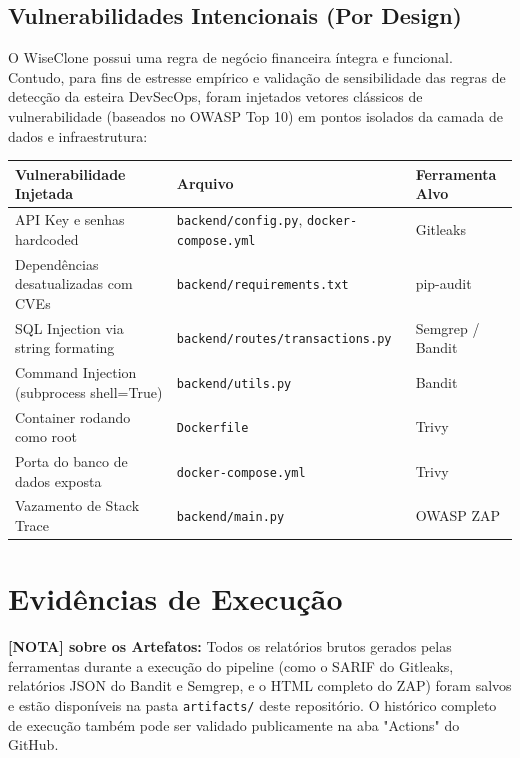 \documentclass[12pt,a4paper]{article}
\begin{document}
\subsection{Vulnerabilidades Intencionais (Por Design)}
O WiseClone possui uma regra de negócio financeira íntegra e funcional. Contudo, para fins de estresse empírico e validação de sensibilidade das regras de detecção da esteira DevSecOps, foram injetados vetores clássicos de vulnerabilidade (baseados no OWASP Top 10) em pontos isolados da camada de dados e infraestrutura:

\begin{table}[h]
\centering
\begin{tabularx}{\textwidth}{|X|X|l|}
\hline
\textbf{Vulnerabilidade Injetada} & \textbf{Arquivo} & \textbf{Ferramenta Alvo} \\ \hline
API Key e senhas hardcoded & \texttt{backend/config.py}, \texttt{docker-compose.yml} & Gitleaks \\ \hline
Dependências desatualizadas com CVEs & \texttt{backend/requirements.txt} & pip-audit \\ \hline
SQL Injection via string formating & \texttt{backend/routes/transactions.py} & Semgrep / Bandit \\ \hline
Command Injection (subprocess shell=True) & \texttt{backend/utils.py} & Bandit \\ \hline
Container rodando como root & \texttt{Dockerfile} & Trivy \\ \hline
Porta do banco de dados exposta & \texttt{docker-compose.yml} & Trivy \\ \hline
Vazamento de Stack Trace & \texttt{backend/main.py} & OWASP ZAP \\ \hline
\end{tabularx}
\end{table}

\section{Evidências de Execução}

\begin{mdframed}[backgroundcolor=gray!10]
\textbf{[NOTA] sobre os Artefatos:} Todos os relatórios brutos gerados pelas ferramentas durante a execução do pipeline (como o SARIF do Gitleaks, relatórios JSON do Bandit e Semgrep, e o HTML completo do ZAP) foram salvos e estão disponíveis na pasta \texttt{artifacts/} deste repositório. O histórico completo de execução também pode ser validado publicamente na aba "Actions" do GitHub.
\end{mdframed}
\end{document}
